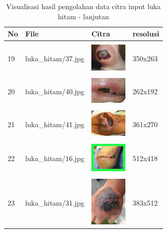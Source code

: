 \begin{table}[H]
	\centering
	\caption{Visualisasi hasil pengolahan data citra input luka hitam - lanjutan}
	\label{tabel_input_3}
	\begin{tabular}{|m{0.2in}|m{1.2in}|m{0.7in}|m{0.7in}|}
		\hline
		\textbf{No} & \textbf{File} & \textbf{Citra} & \textbf{resolusi} \\
		\hline

		& &  &  \\
		19& 
		luka\_hitam/37.jpg &
		\includegraphics[width=0.7in]{gambar/dataset_citra/luka_hitam/bahan/37.jpg}&
		350x263\\
		\hline
		
		& &  &  \\
		20& 
		luka\_hitam/40.jpg &
		\includegraphics[width=0.7in]{gambar/dataset_citra/luka_hitam/bahan/40.jpg}&
		262x192\\
		\hline
		
		& &  &  \\
		21& 
		luka\_hitam/41.jpg &
		\includegraphics[width=0.7in]{gambar/dataset_citra/luka_hitam/bahan/41.jpg}&
		361x270\\
		\hline

		& &  &  \\
		22 & 
		luka\_hitam/16.jpg &
		\includegraphics[width=0.7in]{gambar/dataset_citra/luka_hitam/bahan/16.jpg}&
		512x418\\
		\hline
		
		& &  &  \\
		23 & 
		luka\_hitam/31.jpg &
		\includegraphics[width=0.7in]{gambar/dataset_citra/luka_hitam/bahan/31.jpg}&
		383x512\\
		\hline
		

\end{tabular}
\end{table}
